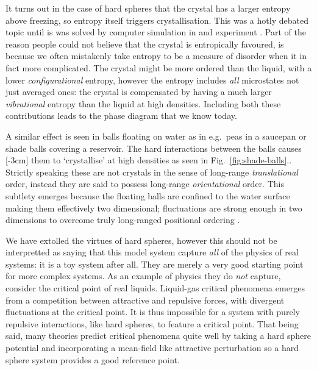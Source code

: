 \documentclass[11pt,twoside]{report}
\begin{document}
It turns out in the case of hard spheres that the crystal has a larger entropy above freezing, so entropy itself triggers crystallisation.
This was a hotly debated topic \cite{?,?,?} until is was solved by computer simulation in \cite{?,?,?} and experiment \cite{?,?,?}.
Part of the reason people could not believe that the crystal is entropically favoured, is because we often mistakenly take entropy to be a measure of disorder when it in fact more complicated.
The crystal might be more ordered than the liquid, with a lower \emph{configurational} entropy, however the entropy includes \emph{all} microstates not just averaged ones: the crystal is compensated by having a much larger \emph{vibrational} entropy than the liquid at high densities.
Including both these contributions leads to the phase diagram that we know today.

A similar effect is seen in balls floating on water as in e.g.\ peas in a saucepan or shade balls covering a reservoir.
The hard interactions between the balls causes%
[-3cm]
them to `crystallise' at high densities as seen in Fig.\ \ref{fig:shade-balls}..
Strictly speaking these are not crystals in the sense of long-range \emph{translational} order, instead they are said to possess long-range \emph{orientational} order.
This subtlety emerges because the floating balls are confined to the water surface making them effectively two dimensional; fluctuations are strong enough in two dimensions to overcome truly long-ranged positional ordering \cite{MerminPRL1966,MerminPR1968}.

We have extolled the virtues of hard spheres, however this should not be interpretted as saying that this model system capture \emph{all} of the physics of real systems: it is a toy system after all.
They are merely a very good starting point for more complex systems.
As an example of physics they do \emph{not} capture, consider the critical point of real liquids.
Liquid-gas critical phenomena emerges from a competition between attractive and repulsive forces, with divergent fluctuations at the critical point.
It is thus impossible for a system with purely repulsive interactions, like hard spheres, to feature a critical point.
That being said, many theories predict critical phenomena quite well by taking a hard sphere potential and incorporating a mean-field like attractive perturbation \cite{?} so a hard sphere system provides a good reference point.
\end{document}
